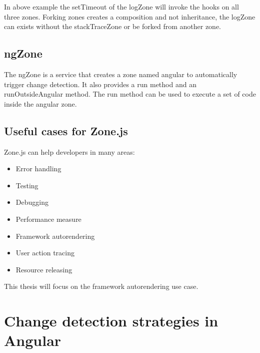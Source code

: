 In above example the setTimeout of the logZone will invoke the hooks on all three zones. Forking zones creates a composition and not inheritance, the logZone can exists without the stackTraceZone or be forked from another zone.

\subsection{ngZone}
The ngZone is a service that creates a zone named angular to automatically trigger change detection. It also provides a run method and an runOutsideAngular method. The run method can be used to execute a set of code inside the angular zone.

\subsection{Useful cases for Zone.js}
Zone.js can help developers in many areas: 
\begin{itemize}
	\item Error handling
	\item Testing
	\item Debugging
	\item Performance measure
	\item Framework autorendering
	\item User action tracing
	\item Resource releasing
\end{itemize}


This thesis will focus on the framework autorendering use case.



\section{Change detection strategies in Angular}
